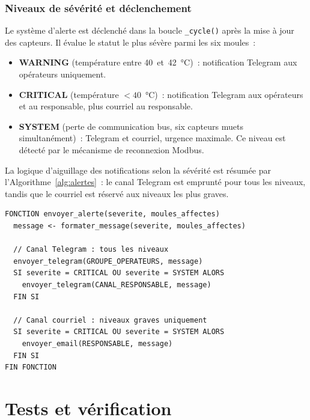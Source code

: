 \subsubsection{Niveaux de sévérité et déclenchement}

Le système d'alerte est déclenché dans la boucle \texttt{\_cycle()} après la mise à jour des capteurs. Il évalue le statut le plus sévère parmi les six moules~:

\begin{itemize}
  \item \textbf{WARNING} (température entre 40~et~42~\si{\celsius})~: notification Telegram aux opérateurs uniquement.
  \item \textbf{CRITICAL} (température \(<40\)~\si{\celsius})~: notification Telegram aux opérateurs et au responsable, plus courriel au responsable.
  \item \textbf{SYSTEM} (perte de communication bus, six capteurs muets simultanément)~: Telegram et courriel, urgence maximale. Ce niveau est détecté par le mécanisme de reconnexion Modbus.
\end{itemize}

La logique d'aiguillage des notifications selon la sévérité est résumée par l'Algorithme~\ref{alg:alertes}~: le canal Telegram est emprunté pour tous les niveaux, tandis que le courriel est réservé aux niveaux les plus graves.

\begin{algorithm}[htbp]
\caption{Envoi des notifications selon la sévérité}
\label{alg:alertes}
\begin{minipage}{0.95\textwidth}
\begin{verbatim}
FONCTION envoyer_alerte(severite, moules_affectes)
  message <- formater_message(severite, moules_affectes)

  // Canal Telegram : tous les niveaux
  envoyer_telegram(GROUPE_OPERATEURS, message)
  SI severite = CRITICAL OU severite = SYSTEM ALORS
    envoyer_telegram(CANAL_RESPONSABLE, message)
  FIN SI

  // Canal courriel : niveaux graves uniquement
  SI severite = CRITICAL OU severite = SYSTEM ALORS
    envoyer_email(RESPONSABLE, message)
  FIN SI
FIN FONCTION
\end{verbatim}
\end{minipage}
\end{algorithm}

\section{Tests et vérification}


